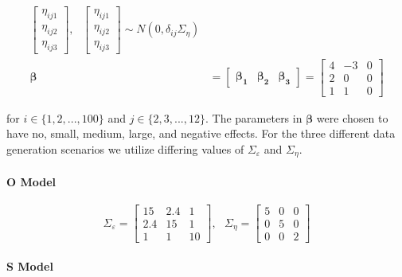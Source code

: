 \documentclass[
]{article}
\begin{document}
\begin{equation}
\begin{aligned}
\begin{bmatrix}
\eta_{ij1}\\
\eta_{ij2}\\
\eta_{ij3}
\end{bmatrix}, \ \ \
\begin{bmatrix}
\eta_{ij1}\\
\eta_{ij2}\\
\eta_{ij3}
\end{bmatrix} \sim N(0, \delta_{ij} \Sigma_\eta 
)\\
\boldsymbol{\beta} &= \begin{bmatrix} \boldsymbol{\beta_1} & \boldsymbol{\beta_2} &  \boldsymbol{\beta_3} \end{bmatrix} = 
\begin{bmatrix}
4 & -3 & 0\\
2 & 0 & 0\\
1 & 1 & 0
\end{bmatrix}
\end{aligned}
\end{equation}

for \(i \in \{1, 2, ..., 100\}\) and \(j \in \{2, 3,..., 12\}\). The parameters in \(\boldsymbol{\beta}\) were chosen to have no, small, medium, large, and negative effects. For the three different data generation scenarios we utilize differing values of \(\Sigma_\varepsilon\) and \(\Sigma_\eta\).

\hypertarget{o-model}{%
\paragraph{O Model}\label{o-model}}

\begin{equation}\label{eq:O}
\Sigma_\varepsilon = 
\begin{bmatrix}
15 & 2.4 & 1\\
2.4 & 15 & 1\\
1 & 1 & 10
\end{bmatrix}, \ \ \ 
\Sigma_\eta =
\begin{bmatrix}
5 & 0 & 0\\
0 & 5 & 0\\
0 & 0 & 2
\end{bmatrix}
\end{equation}

\hypertarget{s-model}{%
\paragraph{S Model}\label{s-model}}
\end{document}
